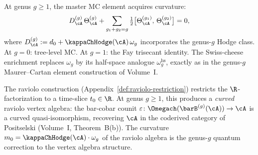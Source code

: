 \begin{construction}
\label{constr:vol2-genus-g-mc}
At genus $g \geq 1$, the master MC element acquires curvature:
\[
D^{(g)}_\cA\,\Theta_\cA^{(g)} + \sum_{g_1 + g_2 = g} \tfrac{1}{2}\bigl[\Theta_\cA^{(g_1)},\, \Theta_\cA^{(g_2)}\bigr] = 0,
\]
where $D^{(g)}_\cA := d_0 + \kappaChHodge(\cA)\,\omega_g$ incorporates the genus-$g$ Hodge class. At $g = 0$: tree-level MC. At $g = 1$: the Fay trisecant identity. The Swiss-cheese enrichment replaces $\omega_g$ by its half-space analogue $\omega_g^{\mathrm{hs}}$, exactly as in the genus-$g$ Maurer--Cartan element construction of Volume~I.
\end{construction}

\begin{remark}
The raviolo construction (Appendix~\ref{def:raviolo-restriction})
restricts the $\R$-factorization to a time-slice $t_0 \in \R$.
At genus $g \geq 1$, this produces a \emph{curved} raviolo vertex
algebra: the bar-cobar counit
$\varepsilon\colon \Omegach(\barB^{(g)}(\cA)) \to \cA$ is a
curved quasi-isomorphism, recovering $\cA$ in the coderived
category of Positselski (Volume~I, Theorem~B(b)). The curvature
$m_0 = \kappaChHodge(\cA) \cdot \omega_g$ of the raviolo algebra
is the genus-$g$ quantum correction to the vertex algebra
structure.
\end{remark}

